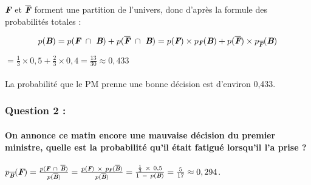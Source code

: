 \documentclass[a4paper, 12pt]{article}
\begin{document}
\begin{center}
\end{center}
\vspace{3mm}
$\emph{\textbf{F}}$ et $\overline{\emph{\textbf{F}}}$ forment une partition de l'univers, donc d'après la formule des probabilités totales :
\begin{fleqn}
\[p(\emph{\textbf{B}}) = p(\emph{\textbf{F}}\  \cap \ \emph{\textbf{B}}) + p(\overline{\emph{\textbf{F}}}\ \cap \ \emph{\textbf{B}}) 
= p(\emph{\textbf{F}}) \times p_{\emph{\textbf{F}}}(\emph{\textbf{B}}) + p(\overline{\emph{\textbf{F}}}) \times p_{\overline{\emph{\textbf{F}}}}(\emph{\textbf{B}}) \]
\end{fleqn}
$= \frac{1}{3} \times 0,5 + \frac{2}{3} \times 0,4 = \frac{13}{30} \approx 0,433$
\\ \\
La probabilité que le PM prenne une bonne décision est d'environ 0,433.

{}
\subsubsection*{Question 2 :}
\paragraph*{On annonce ce matin encore une mauvaise décision du premier ministre, quelle est la probabilité qu'il était fatigué lorsqu'il l'a prise ?\\[5mm]}

$p_{\overline{\emph{\textbf{B}}}}(\emph{\textbf{F}}) = \frac{p(\emph{\textbf{F}}\ \cap \ \overline{\emph{\textbf{B}}})}{p(\overline{\emph{\textbf{B}}})}
= \frac{p(\emph{\textbf{F}})\ \times \ p_{\emph{\textbf{F}}}(\overline{\emph{\textbf{B}}})}{p(\overline{\emph{\textbf{B}}})}
= \frac{\frac{1}{3}\ \times \ 0,5}{1\ -\ p(\emph{\textbf{B}})} = \frac{5}{17} \approx 0,294$.
\vspace{2cm}
\end{document}

